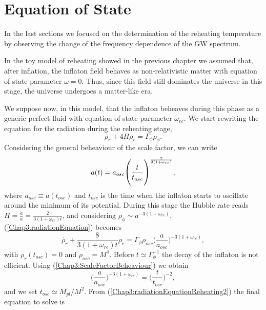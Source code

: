 \documentclass[11pt,a4paper,twoside]{book}
\begin{document}
\section{Equation of State}
In the last sections we focused on the determination of the reheating temperature by observing the change of the frequency dependence of the GW spectrum. 

In the toy model of reheating showed in the previous chapter we assumed that, after inflation, the inflaton field behaves as non-relativistic matter with equation of state parameter $\omega = 0$. Thus, since this field still dominates the universe in this stage, the universe undergoes a matter-like era. 

We suppose now, in this model, that the inflaton beheaves during this phase as a generic perfect fluid with equation of state parameter $ \omega_{re} $.
We start rewriting the equation for the radiation during the reheating stage,
\begin{equation}
	\label{Chap3:radiationEquation}
	\dot{\rho_{r}} + 4H\rho_{r} = \Gamma_{\phi}\rho_{\phi}.
\end{equation}
Considering the general beheaviour of the scale factor, we can write
\begin{equation}
	\label{Chap3:ScaleFactorBeheaviour}
	\large
	a(t)=a_{osc}\Bigg(\frac{t}{t_{osc}}\Bigg)^{\frac{2}{3(1+\omega_{re})}},
\end{equation}
where $ a_{osc} \equiv a(t_{osc}) $ and $ t_{osc} $ is the time when the inflaton starts to oscillate around the minimum of its potential. During this stage the Hubble rate reads $ H=\frac{\dot{a}}{a}= \frac{2}{3(1+\omega_{re})t} $, and considering $\rho_{\phi} \sim a^{-3(1+\omega_{re})}$, (\ref{Chap3:radiationEquation}) becomes
\begin{equation}
	\label{Chap3:radiationEquationReheating2}
	\dot{\rho_{r}} + \frac{8}{3(1+\omega_{re})t}\rho_{r} = \Gamma_{\phi}\rho_{osc}\Bigg(\frac{a}{a_{osc}}\Bigg)^{-3(1+\omega_{re})},
\end{equation}
with $\rho_{r}(t_{osc})=0$ and $ \rho_{osc} = M^{4} $.
Before $ t \simeq \Gamma_{\phi}^{-1} $ the decay of the inflaton is not efficient. Using (\ref{Chap3:ScaleFactorBeheaviour}) we obtain
\begin{equation}
	\label{Chap3:TimeBeheaviour}
	\Bigg(\frac{a}{a_{osc}}\Bigg)^{-3(1+\omega_{re})} =  \Bigg(\frac{t}{t_{osc}}\Bigg)^{-2},
\end{equation}
and we set $ t_{osc}\simeq M_{pl}/M^{2} $. From (\ref{Chap3:radiationEquationReheating2}) the final equation to solve is
\end{document}
